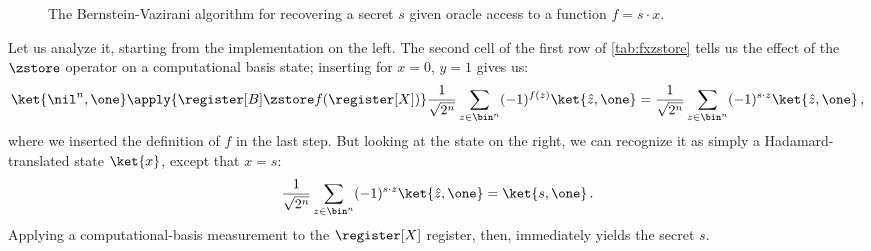       \begin{figure}[h!]
   	    \begin{center}
        \end{center}
        \caption{
          \label{fig:BernsteinVazirani}
          The Bernstein-Vazirani algorithm for recovering a secret $s$ given
          oracle access to a function $f = s \cdot x$.
        }
      \end{figure}

      Let us analyze it, starting from the implementation on the left.
        The second cell of the first row of \cref{tab:fxzstore} tells us the
        effect of the $\zstore$ operator on a computational basis state;
        inserting for $x = 0$, $y=1$ gives us:
      \[
        \ket{\nil^n, \one}
        \apply{\register[B] \zstore f(\register[X])}
        \frac{1}{\sqrt{2^n}} \sum_{z \in \bin^n} (-1)^{f(z)} \ket{\hat{z}, \one}
        = \frac{1}{\sqrt{2^n}} \sum_{z \in \bin^n} (-1)^{s \cdot z} \ket{\hat{z}, \one}\, ,
      \]
      where we inserted the definition of $f$ in the last step. But looking at
      the state on the right, we can recognize it as simply a
      Hadamard-translated state $\ket{x}$, except that $x = s$:
      \[
        \frac{1}{\sqrt{2^n}} \sum_{z \in \bin^n} (-1)^{s \cdot z} \ket{\hat{z}, \one}
        = \ket{s, \one}\, .
      \]
      Applying a computational-basis measurement to the $\register[X]$ register,
      then, immediately yields the secret $s$.

